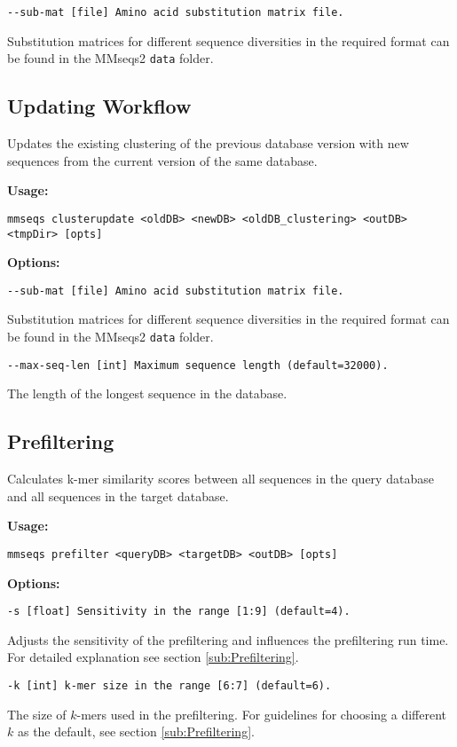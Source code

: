 \documentclass[11pt,a4paper]{scrreprt}
\begin{document}
\texttt{\small -{}-sub-mat {[}file{]} Amino acid substitution matrix file.}{\small \par}

Substitution matrices for different sequence diversities in the required format can be found in the MMseqs2 \texttt{data} folder.
\subsection{Updating Workflow}
Updates the existing clustering of the previous database version with new sequences from the current version of the same database.

\textbf{Usage:}

\texttt{mmseqs clusterupdate <oldDB> <newDB> <oldDB\_clustering> <outDB> <tmpDir> {[}opts{]}}

\textbf{Options:}

\texttt{\small -{}-sub-mat {[}file{]} Amino acid substitution matrix file.}{\small \par}

Substitution matrices for different sequence diversities in the required format can be found in the MMseqs2 \texttt{data} folder.

\texttt{\small -{}-max-seq-len {[}int{]} Maximum sequence length (default=32000).}{\small \par}

The length of the longest sequence in the database.
\subsection{Prefiltering}
Calculates k-mer similarity scores between all sequences in the query database and all sequences in the target database.

\textbf{Usage:}

\texttt{mmseqs prefilter <queryDB> <targetDB> <outDB> {[}opts{]}}

\textbf{Options:}

\texttt{\small -s {[}float{]} Sensitivity in the range {[}1:9{]} (default=4).}{\small \par}

Adjusts the sensitivity of the prefiltering and influences the prefiltering run time. For detailed explanation see section \ref{sub:Prefiltering}.

\texttt{\small -k {[}int{]} k-mer size in the range {[}6:7{]} (default=6).}{\small \par}

The size of $k$-mers used in the prefiltering. For guidelines for choosing a different $k$ as the default, see section \ref{sub:Prefiltering}.
\end{document}
